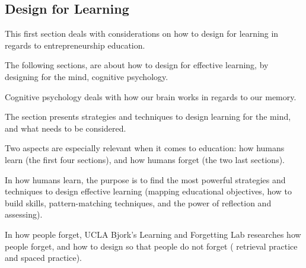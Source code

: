 \subsection{Design for Learning}


This first section deals with considerations on how to design for learning in regards to entrepreneurship education.

The following sections, are about how to design for effective learning, by designing for the mind, cognitive psychology.

Cognitive psychology deals with how our brain works in regards to our memory.

The section presents strategies and techniques to design learning for the mind, and what needs to be considered.

Two aspects are especially relevant when it comes to education: how humans learn (the first four sections), and how humans forget (the two last sections).

In how humans learn, the purpose is to find the most powerful strategies and techniques to design effective learning (mapping educational objectives, how to build skills, pattern-matching techniques, and the power of reflection and assessing).

In how people forget, UCLA Bjork's Learning and Forgetting Lab \cite{ucla} researches how people forget, and how to design so that people do not forget ( retrieval practice and spaced practice).






